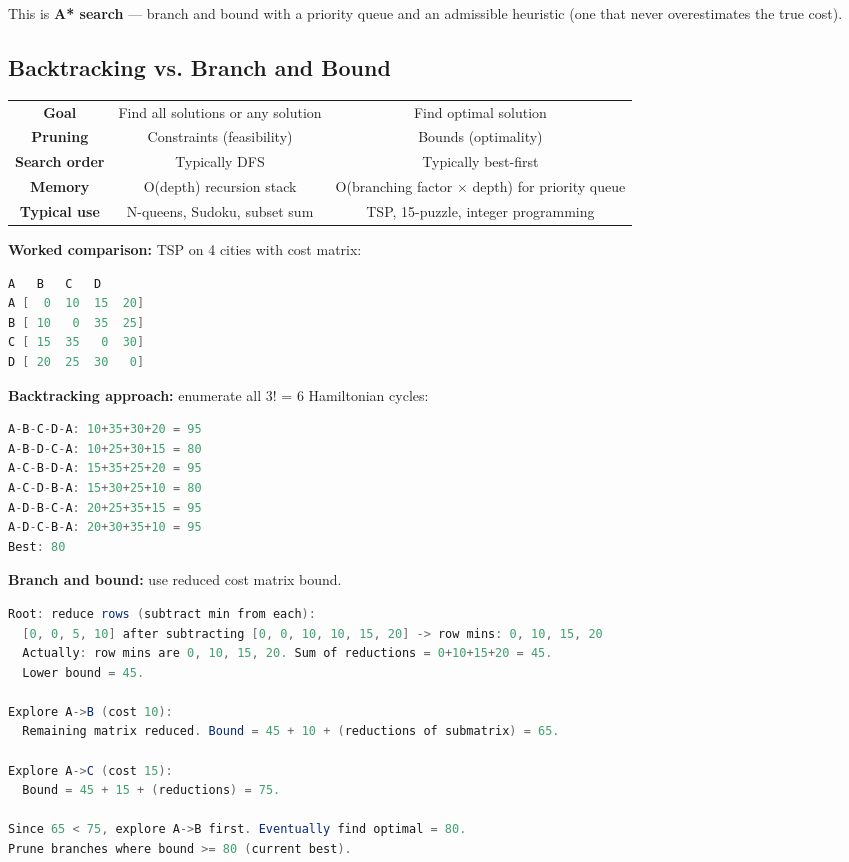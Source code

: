 This is \textbf{A* search} — branch and bound with a priority queue and an admissible heuristic (one that never overestimates the true cost).

\subsection{Backtracking vs. Branch and Bound}

\begin{center}
\begin{tabular}{ccc}
\toprule
\textbf{Goal} & Find all solutions or any solution & Find optimal solution \\
\textbf{Pruning} & Constraints (feasibility) & Bounds (optimality) \\
\textbf{Search order} & Typically DFS & Typically best-first \\
\textbf{Memory} & O(depth) recursion stack & O(branching factor $\times $ depth) for priority queue \\
\textbf{Typical use} & N-queens, Sudoku, subset sum & TSP, 15-puzzle, integer programming \\

\bottomrule
\end{tabular}
\end{center}

\textbf{Worked comparison:} TSP on 4 cities with cost matrix:

\begin{lstlisting}[language=Java]
     A   B   C   D
A [  0  10  15  20]
B [ 10   0  35  25]
C [ 15  35   0  30]
D [ 20  25  30   0]
\end{lstlisting}

\textbf{Backtracking approach:} enumerate all 3! = 6 Hamiltonian cycles:
\begin{lstlisting}[language=Java]
A-B-C-D-A: 10+35+30+20 = 95
A-B-D-C-A: 10+25+30+15 = 80
A-C-B-D-A: 15+35+25+20 = 95
A-C-D-B-A: 15+30+25+10 = 80
A-D-B-C-A: 20+25+35+15 = 95
A-D-C-B-A: 20+30+35+10 = 95
Best: 80
\end{lstlisting}

\textbf{Branch and bound:} use reduced cost matrix bound.
\begin{lstlisting}[language=Java]
Root: reduce rows (subtract min from each):
  [0, 0, 5, 10] after subtracting [0, 0, 10, 10, 15, 20] -> row mins: 0, 10, 15, 20
  Actually: row mins are 0, 10, 15, 20. Sum of reductions = 0+10+15+20 = 45.
  Lower bound = 45.

Explore A->B (cost 10):
  Remaining matrix reduced. Bound = 45 + 10 + (reductions of submatrix) = 65.
  
Explore A->C (cost 15):
  Bound = 45 + 15 + (reductions) = 75.

Since 65 < 75, explore A->B first. Eventually find optimal = 80.
Prune branches where bound >= 80 (current best).
\end{lstlisting}

